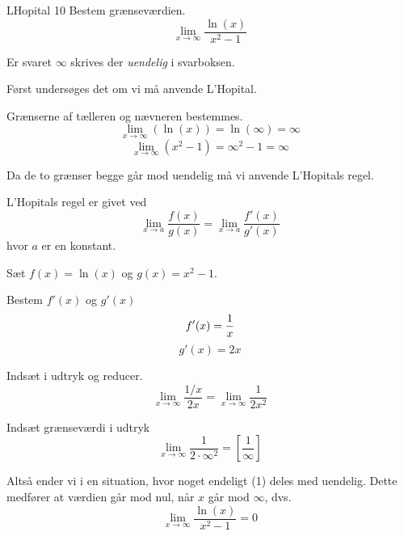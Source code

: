 \documentclass{article}
\begin{document}
\begin{exercise}{LHopital 10}
Bestem grænseværdien.
\[
\lim_{x \to \infty} \frac{\ln(x)}{x^2 - 1}
\]

Er svaret $\infty$ skrives der \emph{uendelig} i svarboksen.


\hint
Først undersøges det om vi må anvende L'Hopital.

\hint
Grænserne af tælleren og nævneren bestemmes.
\[
\lim_{x \to \infty} (\ln(x)) = \ln(\infty) = \infty
\]
\[
\lim_{x \to \infty} (x^2 - 1) = \infty^2 - 1 = \infty
\]

\hint
Da de to grænser begge går mod uendelig må vi anvende L'Hopitals regel.

\hint
L'Hopitals regel er givet ved
\[
\lim_{x \to a} \frac{f(x)}{g(x)} = \lim_{x \to a} \frac{f'(x)}{g'(x)}
\]
hvor $a$ er en konstant.

\hint
Sæt $f(x) = \ln(x)$ og $g(x) = x^2 - 1$.

\hint
Bestem $f'(x)$ og $g'(x)$
\[
f'(x) = \frac{1}{x} \\
\]
\[
g'(x) = 2x
\]

\hint
Indsæt i udtryk og reducer.
\[
\lim_{x \to \infty} \frac{1/x}{2x} = \lim_{x \to \infty} \frac{1}{2x^2}
\]

\hint
Indsæt grænseværdi i udtryk
\[
\lim_{x \to \infty} \frac{1}{2 \cdot \infty^2} = \left[ \frac{1}{\infty} \right]
\]

\hint
Altså ender vi i en situation, hvor noget endeligt (1) deles med uendelig. Dette medfører at værdien går mod nul, når $x$ går mod $\infty$, dvs.
\[
\lim_{x \to \infty} \frac{\ln(x)}{x^2 - 1} = 0
\]


\end{exercise}
\end{document}
